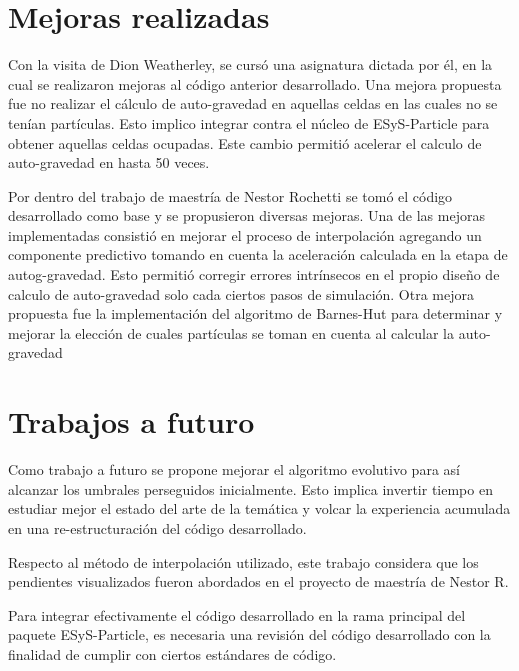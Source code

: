 \documentclass[a4paper,11pt]{book}
\begin{document}
\section{Mejoras realizadas}
Con la visita de Dion Weatherley, se cursó una asignatura dictada por él, en la cual se realizaron mejoras al código anterior desarrollado. Una mejora propuesta fue no realizar el cálculo de auto-gravedad en aquellas celdas en las cuales no se tenían partículas. Esto implico integrar contra el núcleo de ESyS-Particle para obtener aquellas celdas ocupadas. Este cambio permitió acelerar el calculo de auto-gravedad en hasta 50 veces.

Por dentro del trabajo de maestría de Nestor Rochetti se tomó el código desarrollado como base y se propusieron diversas mejoras. Una de las mejoras implementadas consistió en mejorar el proceso de interpolación agregando un componente predictivo tomando en cuenta la aceleración calculada en la etapa de autog-gravedad. Esto permitió corregir errores intrínsecos en el propio diseño de calculo de auto-gravedad solo cada ciertos pasos de simulación. Otra mejora propuesta fue la implementación del algoritmo de Barnes-Hut para determinar y mejorar la elección de cuales partículas se toman en cuenta al calcular la auto-gravedad \cite{5}

\section{Trabajos a futuro}
Como trabajo a futuro se propone mejorar el algoritmo evolutivo para así alcanzar los umbrales perseguidos inicialmente. Esto implica invertir tiempo en estudiar mejor el estado del arte de la temática y volcar la experiencia acumulada en una re-estructuración del código desarrollado.

Respecto al método de interpolación utilizado, este trabajo considera que los pendientes visualizados fueron abordados en el proyecto de maestría de Nestor R.

Para integrar efectivamente el código desarrollado en la rama principal del paquete ESyS-Particle, es necesaria una revisión del código desarrollado con la finalidad de cumplir con ciertos estándares de código.

\newpage


\end{document}
